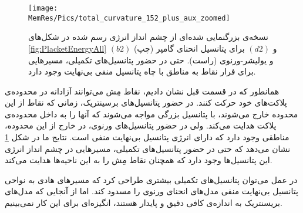 \begin{figure}[h]
\begin{center}
\texttt{[image: \\MemRes/Pics/total\_curvature\_152\_plus\_aux\_zoomed]}
\caption{
نسخه‌ی بزرگنمایی شده‌ای از چشم‌ انداز انرژی رسم شده در شکل‌های 
\ref{fig:PlacketEnergyAll} $(b2)$
و
$(d2)$
برای پتانسیل‌ انحنای گامپر (چپ) و یولیشر-ورنوی (راست). حتی در حضور پتانسیل‌های تکمیلی، مسیرهایی برای فرار نقاط به مناطق با چاه پتانسیل منفی بی‌نهایت وجود دارد.
}
\label{fig:energyLandscapeZoomed}
\end{center}
\end{figure}

همانطور که در قسمت قبل نشان دادیم، نقاط مِش می‌توانند آزادانه در محدوده‌ی پلاکت‌های خود حرکت کنند. در حضور پتانسیل‌های برسینتریک، زمانی که نقاط از این محدوده خارج می‌شوند، با پتانسیل  بزرگی مواجه می‌شوند که آنها را به داخل محدوده‌ی پلاکت هدایت می‌کند. ولی در حضور  پتانسیل‌های ورنوی، در خارج از این محدوده، مناطقی وجود دارد که دارای انرژی پتانسیل بی‌نهایت منفی است. نتایج ما در شکل
\ref{fig:energyLandscapeZoomed}
 نشان می‌دهد که حتی در حضور پتانسیل‌های تکمیلی، مسیر‌هایی در چشم انداز انرژی این پتانسیل‌ها وجود دارد که  همچنان نقاط مِش را به این ناحیه‌ها هدایت می‌کند. 
 
 در عمل می‌توان پتانسیل‌های تکمیلی بیشتری طراحی کرد که مسیر‌های هادی به نواحی پتانسیل بی‌نهایت منفی مدل‌های انحنای ورنوی را مسدود کند. اما از آنجایی که مدل‌های بریسنتریک به اندازه‌ی کافی دقیق و پایدار هستند، انگیزه‌ای برای این کار نمی‌بینیم.



























